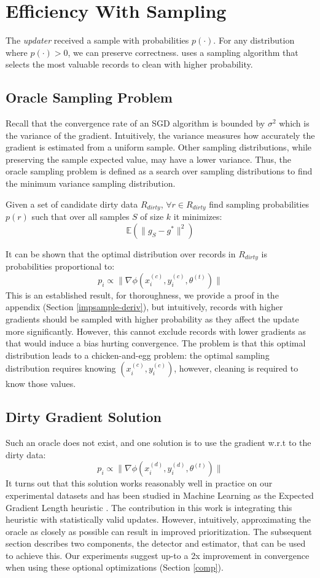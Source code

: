 \section{Efficiency With Sampling}\label{dist-samp}
The \emph{updater} received a sample with probabilities $p(\cdot)$.
For any distribution where  $p(\cdot) > 0$, we can preserve correctness.
\sys uses a sampling algorithm that selects the most valuable records to clean with higher probability. 

\subsection{Oracle Sampling Problem}
Recall that the convergence rate of an SGD algorithm is bounded by $\sigma^2$ which is the variance of the gradient.
Intuitively, the variance measures how accurately the gradient is estimated from a uniform sample.
Other sampling distributions, while preserving the sample expected value, may have a lower variance.
Thus, the oracle sampling problem is defined as a search over sampling distributions to find the minimum variance sampling distribution.

\begin{definition}
Given a set of candidate dirty data $R_{dirty}$, $\forall r \in R_{dirty}$ find sampling probabilities $p(r)$ such that over all samples $S$ of size $k$ it minimizes:
\[
\mathbb{E}(\|g_S - g^*\|^2)
\]
\end{definition}
It can be shown that the optimal distribution over records in $R_{dirty}$ is probabilities proportional to:
\[
p_i \propto \|\nabla\phi(x^{(c)}_i,y^{(c)}_i,\theta^{(t)})\|
\]
This is an established result, for thoroughness, we provide a proof in the appendix (Section \ref{impsample-deriv}), but intuitively, records with higher gradients should be sampled with higher probability as they affect the update more significantly.
However, this cannot exclude records with lower gradients as that would induce a bias hurting convergence.
The problem is that this optimal distribution leads to a chicken-and-egg problem:
the optimal sampling distribution requires knowing $(x^{(c)}_i,y^{(c)}_i)$, however, cleaning is required to know those values.

\subsection{Dirty Gradient Solution}\label{dgsample}
Such an oracle does not exist, and one solution is to use the gradient w.r.t to the dirty data:
\[
p_i \propto \|\nabla\phi(x^{(d)}_i,y^{(d)}_i,\theta^{(t)})\|
\]
It turns out that this solution works reasonably well in practice on our experimental datasets and has been studied in Machine Learning as the Expected Gradient Length heuristic \cite{settles2010active}.
The contribution in this work is integrating this heuristic with statistically valid updates.
However, intuitively, approximating the oracle as closely as possible can result in improved prioritization.
The subsequent section describes two components, the detector and estimator, that can be used to achieve this.
Our experiments suggest up-to a 2x improvement in convergence when using these optional optimizations (Section \ref{comp}).